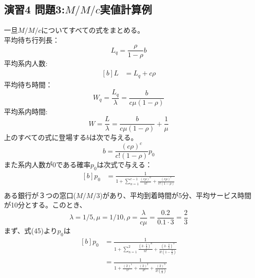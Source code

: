 \documentclass{report}
\begin{document}
\begin{CJK}{UTF8}{min}
    \section*{演習4 問題3:$M/M/c$実値計算例}
    一旦$M/M/c$についてすべての式をまとめる。\\
    平均待ち行列長：
    \begin{equation}
        L_q=\frac{\rho}{1-\rho}b
    \end{equation}
    平均系内人数:
    \begin{equation}
        \begin{aligned}[b]
            L & =L_q+c\rho
        \end{aligned}
    \end{equation}
    平均待ち時間：
    \begin{equation}
        W_q=\frac{L_q}{\lambda}=\frac{b}{c\mu(1-\rho)}
    \end{equation}
    平均系内時間:
    \begin{equation}
        W=\frac{L}{\lambda}=\frac{b}{c\mu(1-\rho)}+\frac{1}{\mu}
    \end{equation}
    上のすべての式に登場する$b$は次で与える。
    \begin{equation}
        b=\frac{(c\rho)^c}{c!(1-\rho)}p_0
    \end{equation}
    また系内人数が0である確率$p_0$は次式で与える：
    \begin{equation}
        \begin{aligned}[b]
            p_0 & =\frac{1}{1+\sum_{n=1}^{c-1} \frac{(c\rho)^n}{n!} + \frac{(c\rho)^c}{c!(1-\rho)}} \\
        \end{aligned}
    \end{equation}
    ある銀行が３つの窓口($M/M/3$)があり、平均到着時間が5分、平均サービス時間が10分とする。このとき、
    \begin{equation}
        \lambda=1/5, \mu=1/10, \rho=\frac{\lambda}{c\mu}=\frac{0.2}{0.1\cdot3}=\frac{2}{3}
    \end{equation}
    まず、式(45)より$p_0$は
    \begin{equation}
        \begin{aligned}[b]
            p_0 & =\frac{1}{1+\sum_{n=1}^{2} \frac{(3\cdot\frac{2}{3})^n}{n!} + \frac{(3\cdot\frac{2}{3})^3}{3!(1-\frac{2}{3})}} \\
                & =\frac{1}{1+\frac{(2)^1}{1!}+\frac{(2)^2}{2!} + \frac{(2)^3}{3!(\frac{1}{3})}}                                 \\

\end{aligned}
\end{equation}
\end{CJK}
\end{document}
